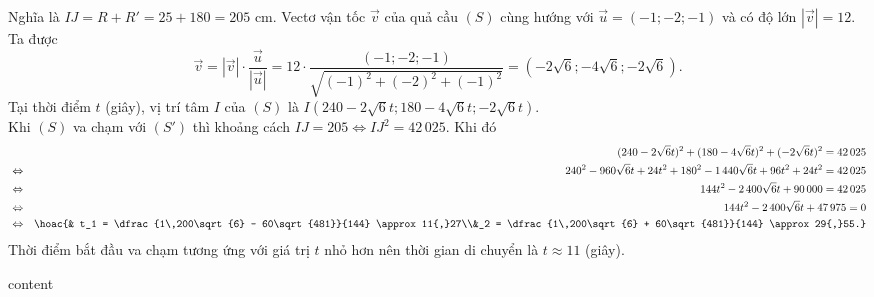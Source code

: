 \begin{ex}
{\begin{itemchoice}
			Nghĩa là $IJ = R + R' = 25 + 180 = 205$ cm.
			\itemch
			Vectơ vận tốc $\overrightarrow{v}$ của quả cầu $(S)$ cùng hướng với $\overrightarrow{u}=(-1;-2;-1)$ và có độ lớn $\left|\overrightarrow{v}\right| = 12$.\\
			Ta được
			\[\overrightarrow{v} = \left|\overrightarrow{v}\right| \cdot \dfrac{\overrightarrow{u}}{\left|\overrightarrow{u}\right|} = 12 \cdot \dfrac{(-1; -2; -1)}{\sqrt{(-1)^2 + (-2)^2 + (-1)^2}} =\left(-2\sqrt{6}; -4\sqrt{6}; -2\sqrt{6}\right). \]
			Tại thời điểm $t$ (giây), vị trí tâm $I$ của $(S)$ là $I\left(240 - 2\sqrt{6}t; 180 - 4\sqrt{6}t; -2\sqrt{6}t\right)$.\\
			Khi $(S)$ va chạm với $(S')$ thì khoảng cách $IJ = 205 \Leftrightarrow IJ^2 = 42\,025$. Khi đó
			\allowdisplaybreaks
			\begin{eqnarray*}
				&&(240-2\sqrt{6}t)^2+(180-4\sqrt{6}t)^2+(-2\sqrt{6}t)^2=42\,025\\
				&\Leftrightarrow&240^2-960\sqrt{6}t+24t^2+180^2-1\,440\sqrt{6}t+96t^2+24t^2=42\,025\\
				&\Leftrightarrow&144t^2-2\,400\sqrt{6}t+90\,000=42\,025\\
				&\Leftrightarrow&144t^2-2\,400\sqrt{6}t+47\,975=0\\
				&\Leftrightarrow&\hoac{& t_1 = \dfrac{1\,200\sqrt{6} - 60\sqrt{481}}{144} \approx 11{,}27\\&_2 = \dfrac{1\,200\sqrt{6} + 60\sqrt{481}}{144} \approx 29{,}55.}
			\end{eqnarray*}
			Thời điểm bắt đầu va chạm tương ứng với giá trị $t$ nhỏ hơn nên thời gian di chuyển là $t \approx 11$ (giây).
		\end{itemchoice}
	}
\end{ex}
\caukq
\begin{ex}
	content
\end{ex}

